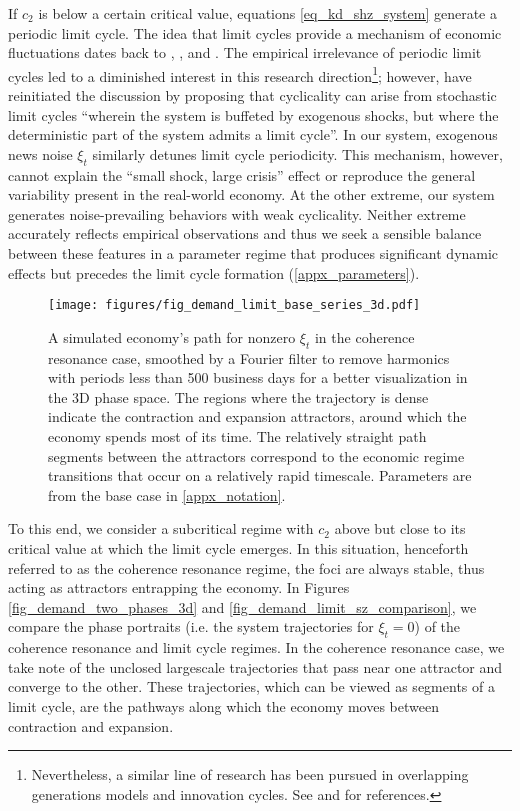 \documentclass[authoryear, review]{elsarticle}
\begin{document}
If $c_2$ is below a certain critical value, equations \eqref{eq_kd_shz_system} generate a periodic limit cycle. The idea that limit cycles provide a mechanism of economic fluctuations dates back to \citet{Kalecki1937}, \citet{Kaldor1940}, \citet{Hicks1950} and \citet{Goodwin1951}. The empirical irrelevance of periodic limit cycles led to a diminished interest in this research direction\footnote{
	 Nevertheless, a similar line of research has been pursued in overlapping generations models and innovation cycles. See \citet{Hommes2013} and \citet{BeaudryEtAl2020} for references.
}; however, \citet{BeaudryEtAl2020} have reinitiated the discussion by proposing that cyclicality can arise from stochastic limit cycles ``wherein the system is buffeted by exogenous shocks, but where the deterministic part of the system admits a limit cycle''. In our system, exogenous news noise $\xi_t$ similarly detunes limit cycle periodicity. This mechanism, however, cannot explain the ``small shock, large crisis'' effect or reproduce the general variability present in the real-world economy. At the other extreme, our system generates noise-prevailing behaviors with weak cyclicality. Neither extreme accurately reflects empirical observations and thus we seek a sensible balance between these features in a parameter regime that produces significant dynamic effects but precedes the limit cycle formation (\ref{appx_parameters}). 

\begin{figure}[htb!]
	\centering
	\texttt{[image: figures/fig\_demand\_limit\_base\_series\_3d.pdf]}
	\caption{A simulated economy's path for nonzero $\xi_t$ in the coherence resonance case, smoothed by a Fourier filter to remove harmonics with periods less than 500 business days for a better visualization in the 3D phase space. The regions where the trajectory is dense indicate the contraction and expansion attractors, around which the economy spends most of its time. The relatively straight path segments between the attractors correspond to the economic regime transitions that occur on a relatively rapid timescale. Parameters are from the base case in \ref{appx_notation}.}
	\label{fig_demand_limit_base_series_3d}
\end{figure}

To this end, we consider a subcritical regime with $c_2$ above but close to its critical value at which the limit cycle emerges. In this situation, henceforth referred to as the coherence resonance regime, the foci are always stable, thus acting as attractors entrapping the economy. In Figures \ref{fig_demand_two_phases_3d} and \ref{fig_demand_limit_sz_comparison},
we compare the phase portraits (i.e. the system trajectories for $\xi_t=0$) of the coherence resonance and limit cycle regimes. In the coherence resonance case, we take note of the unclosed largescale trajectories that pass near one attractor and converge to the other. These trajectories, which can be viewed as segments of a limit cycle, are the pathways along which the economy moves between contraction and expansion.
\end{document}
